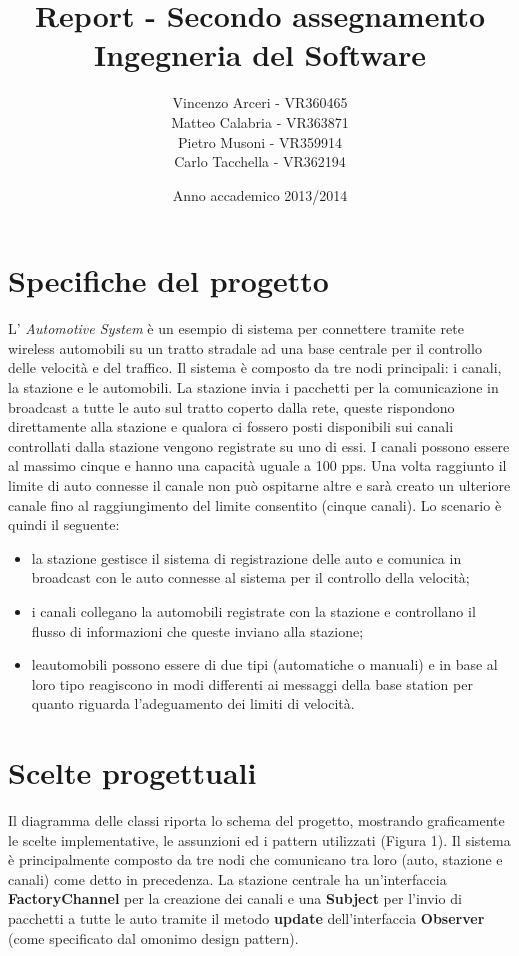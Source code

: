 \documentclass[a4paper,10pt]{article}
\begin{document}
\title{Report - Secondo assegnamento Ingegneria del Software}
\author{Vincenzo Arceri - VR360465\\
 Matteo Calabria - VR363871\\
 Pietro Musoni - VR359914\\ 
Carlo Tacchella - VR362194\\}
\date{Anno accademico 2013/2014}
\maketitle

\section{Specifiche del progetto}

L' \textit{Automotive System} è un esempio di sistema per connettere tramite rete wireless automobili su un tratto stradale ad una base centrale per il controllo delle velocità e del traffico. Il sistema è composto da tre nodi principali: i canali, la stazione e le automobili. La stazione invia i pacchetti per la comunicazione in broadcast a tutte le auto sul tratto coperto dalla rete, queste rispondono direttamente alla stazione e qualora ci fossero posti disponibili sui canali controllati dalla stazione vengono registrate su uno di essi. I canali possono essere al massimo cinque e hanno una capacità uguale a 100 pps. Una volta raggiunto il limite di auto connesse il canale non può ospitarne altre e sarà creato un ulteriore canale fino al raggiungimento del limite consentito (cinque canali).   
Lo scenario è quindi il seguente:
\begin{itemize}
\item la stazione gestisce il sistema di registrazione delle auto e comunica in broadcast con le auto connesse al sistema per il controllo della velocità;
\item i canali collegano la automobili registrate con la stazione e controllano il flusso di informazioni che queste inviano alla stazione;
\item leautomobili possono essere di due tipi (automatiche o manuali) e in base al loro tipo reagiscono in modi differenti ai messaggi della base station per quanto riguarda l'adeguamento dei limiti di velocità. 
\end{itemize}


\section{Scelte progettuali}
Il diagramma delle classi riporta lo schema del progetto, mostrando graficamente le scelte implementative, le assunzioni ed i pattern utilizzati (Figura 1). Il sistema è principalmente composto da tre nodi che comunicano tra loro (auto, stazione e canali) come detto in precedenza. La stazione centrale ha un'interfaccia \textbf{FactoryChannel} per la creazione dei canali e una \textbf{Subject} per l'invio di pacchetti a tutte le auto tramite il metodo \textbf{update} dell'interfaccia \textbf{Observer} (come specificato dal omonimo design pattern). 
\end{document}
